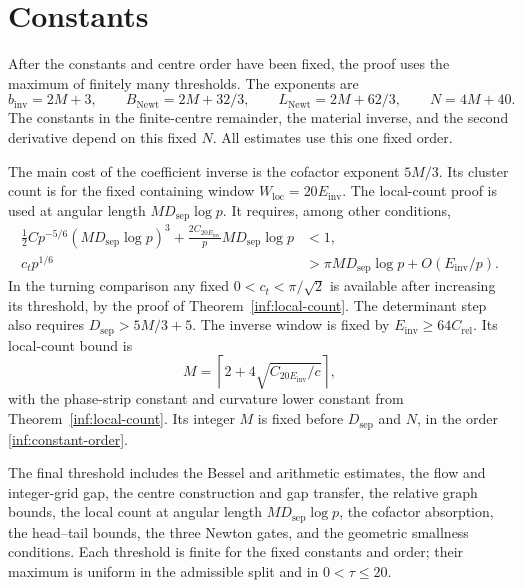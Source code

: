 \section{Constants}\label{inf:sec-constants}

After the constants and centre order have been fixed, the proof
uses the maximum of finitely many thresholds. The exponents are
\[
 b_{\mathrm{inv}}=2M+3,\qquad
 B_{\mathrm{Newt}}=2M+32/3,\qquad
 L_{\mathrm{Newt}}=2M+62/3,\qquad N=4M+40.
\]
The constants in the finite-centre remainder, the material inverse,
and the second derivative depend on this fixed $N$.
All estimates use this one fixed order.

The main cost of the coefficient inverse is the cofactor exponent
$5M/3$. Its cluster count is for the fixed containing window
$W_{\mathrm{loc}}=20E_{\mathrm{inv}}$.
The local-count proof is used at angular length
$M D_{\mathrm{sep}}\log p$.
It requires, among other conditions,
\begin{align}
 \tfrac12C p^{-5/6}(M D_{\mathrm{sep}}\log p)^3
 +\frac{2C_{20E_{\mathrm{inv}}}}p
                  M D_{\mathrm{sep}}\log p&<1,
 \label{inf:constant-lattice}\\
 c_t p^{1/6}&>\pi M D_{\mathrm{sep}}\log p
                       +O(E_{\mathrm{inv}}/p).
 \label{inf:constant-turning}
\end{align}
In the turning comparison any fixed $0<c_t<\pi/\sqrt2$ is available
after increasing its threshold, by the proof of Theorem~\ref{inf:local-count}.
The determinant step also requires
$D_{\mathrm{sep}}>5M/3+5$.
The inverse window is fixed by $E_{\mathrm{inv}}\ge64C_{\mathrm{rel}}$.
Its local-count bound is
\[
 M=\left\lceil 2+4\sqrt{C_{20E_{\mathrm{inv}}}/c}\right\rceil,
\]
with the phase-strip constant and curvature lower constant from
Theorem~\ref{inf:local-count}. Its integer $M$ is fixed before
$D_{\mathrm{sep}}$ and $N$, in the order
\eqref{inf:constant-order}.

The final threshold includes the Bessel and arithmetic estimates,
the flow and integer-grid gap, the centre construction and gap
transfer, the relative graph bounds, the local count at angular
length $MD_{\mathrm{sep}}\log p$, the cofactor absorption, the
head--tail bounds, the three Newton gates, and the geometric
smallness conditions. Each threshold is finite for the fixed
constants and order; their maximum is uniform in the admissible
split and in $0<\tau\le20$.
